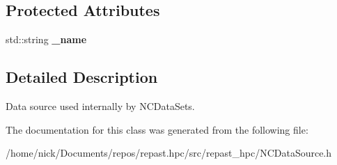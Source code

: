 \subsection*{Protected Attributes}
\begin{DoxyCompactItemize}
\item 
\hypertarget{classrepast_1_1_n_c_data_source_a6bc7455c847f7296f84c85df369b6631}{std\-::string {\bfseries \-\_\-name}}\label{classrepast_1_1_n_c_data_source_a6bc7455c847f7296f84c85df369b6631}

\end{DoxyCompactItemize}


\subsection{Detailed Description}
Data source used internally by N\-C\-Data\-Sets. 

The documentation for this class was generated from the following file\-:\begin{DoxyCompactItemize}
\item 
/home/nick/\-Documents/repos/repast.\-hpc/src/repast\-\_\-hpc/N\-C\-Data\-Source.\-h\end{DoxyCompactItemize}
